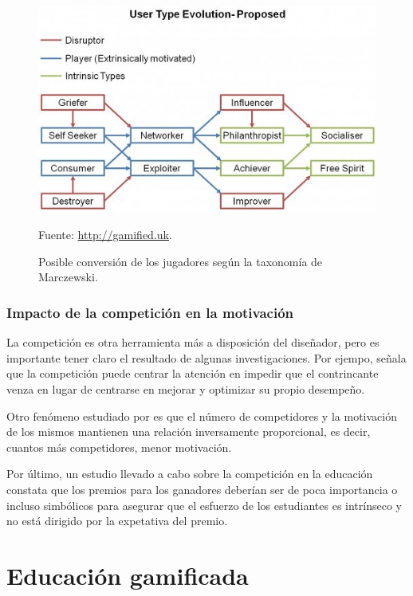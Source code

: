 \begin{figure}[hbtp]
\begin{center}
\includegraphics[scale=0.65]{img/evolution.jpg}
\caption{Posible conversión de los jugadores según la taxonomía de Marczewski.}
\label{fig::MarczewskiEvol}
\vspace{-0.25cm}
\small{Fuente: \url{http://gamified.uk}.}
\end{center}
\end{figure}
\FloatBarrier



\subsubsection{Impacto de la competición en la motivación}


La competición es otra herramienta más a disposición del diseñador, pero es importante tener claro el resultado de algunas investigaciones.
%
Por ejempo,  \cite{Crawford_CompetitionDef} señala que la competición puede centrar la atención en impedir que el contrincante venza en lugar de centrarse en mejorar y optimizar su propio desempeño.

Otro fenómeno estudiado por  \cite{n-effect} es que el número de competidores y la motivación de los mismos mantienen una relación inversamente proporcional, es decir, cuantos más competidores, menor motivación.

Por último, un estudio llevado a cabo sobre la competición en la educación  \cite{CompetitionInEd} constata que los premios para los ganadores deberían ser de poca importancia o incluso simbólicos para asegurar que el esfuerzo de los estudiantes es intrínseco y no está dirigido por la expetativa del premio.


\section{Educación gamificada}


